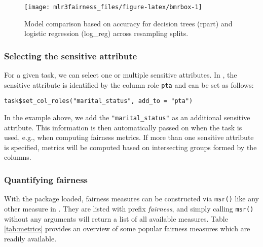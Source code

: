 \begin{figure}

{\centering \texttt{[image: mlr3fairness\_files/figure-latex/bmrbox-1]} 

}

\caption{Model comparison based on accuracy for decision trees (rpart) and logistic regression (log\_reg) across resampling splits.}\label{fig:bmrbox}
\end{figure}

\hypertarget{selecting-the-sensitive-attribute}{%
\subsubsection{Selecting the sensitive attribute}\label{selecting-the-sensitive-attribute}}

For a given task, we can select one or multiple sensitive attributes.
In , the sensitive attribute is identified by the column role \texttt{pta} and can be set as follows:

\begin{verbatim}
task$set_col_roles("marital_status", add_to = "pta")
\end{verbatim}

In the example above, we add the \texttt{"marital\_status"} as an additional sensitive attribute.
This information is then automatically passed on when the task is used, e.g., when computing fairness metrics.
If more than one sensitive attribute is specified, metrics will be computed based on intersecting groups formed by the columns.

\hypertarget{quantifying-fairness-1}{%
\subsubsection{Quantifying fairness}\label{quantifying-fairness-1}}

With the  package loaded, fairness measures can be constructed via \texttt{msr()} like any other measure in .
They are listed with prefix \emph{fairness}, and simply calling \texttt{msr()} without any arguments will return a list of all available measures.
Table \ref{tab:metrics} provides an overview of some popular fairness measures which are readily available.

